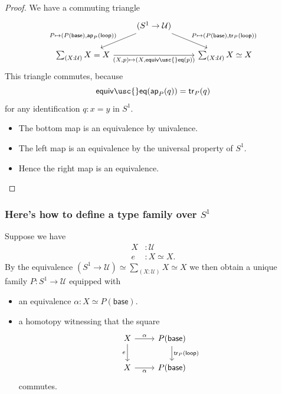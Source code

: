 \documentclass[handout]{beamer}
\newcommand{\UU}{\mathcal{U}}
\newcommand{\sphere}[1]{S^{#1}}
\newcommand{\ap}{\mathsf{ap}}
\newcommand{\baseS}{\mathsf{base}}
\newcommand{\loopS}{\mathsf{loop}}
\newcommand{\tr}{\mathsf{tr}}
\newcommand{\equiveq}{\mathsf{equiv\usc{}eq}}
\begin{document}
\begin{frame}
  \begin{proof}
    We have a commuting triangle
    \begin{equation*}
      \begin{tikzcd}[ampersand replacement=\&]
        \& (\sphere{1}\to\UU) \arrow[dl,swap,"{P\mapsto(P(\baseS),\ap_P(\loopS))}"] \arrow[dr,"{P\mapsto(P(\baseS),\tr_P(\loopS))}"] \\
        \sum_{(X:\UU)}X=X \arrow[rr,swap,"{(X,p)\mapsto(X,\equiveq(p))}"] \& \& \sum_{(X:\UU)}X\simeq X
      \end{tikzcd}
    \end{equation*}
    This triangle commutes, because
    \begin{equation*}
      \equiveq(\ap_P(q))=\tr_P(q)
    \end{equation*}
    for any identification $q:x=y$ in $\sphere{1}$.
    \begin{itemize}
    \item The bottom map is an equivalence by univalence.
    \item The left map is an equivalence by the universal property of $\sphere{1}$.
    \item Hence the right map is an equivalence.\qedhere
    \end{itemize}
  \end{proof}
\end{frame}

\begin{frame}
  \frametitle{Here's how to define a type family over $\sphere{1}$}
  Suppose we have
  \begin{align*}
    X & : \UU \\
    e & : X \simeq X.
  \end{align*}
  By the equivalence $(\sphere{1}\to\UU)\simeq\sum_{(X:\UU)}X\simeq X$ we then obtain a unique family $P:\sphere{1}\to\UU$ equipped with
  \begin{itemize}
  \item an equivalence $\alpha:X\simeq P(\baseS)$.
  \item a homotopy witnessing that the square
    \begin{equation*}
      \begin{tikzcd}[ampersand replacement=\&]
        X \arrow[d,swap,"e"] \arrow[r,"\alpha"] \& P(\baseS) \arrow[d,"\tr_P(\loopS)"] \\
        X \arrow[r,swap,"\alpha"] \& P(\baseS)
      \end{tikzcd}
    \end{equation*}
    commutes.
  \end{itemize}
\end{frame}
\end{document}
